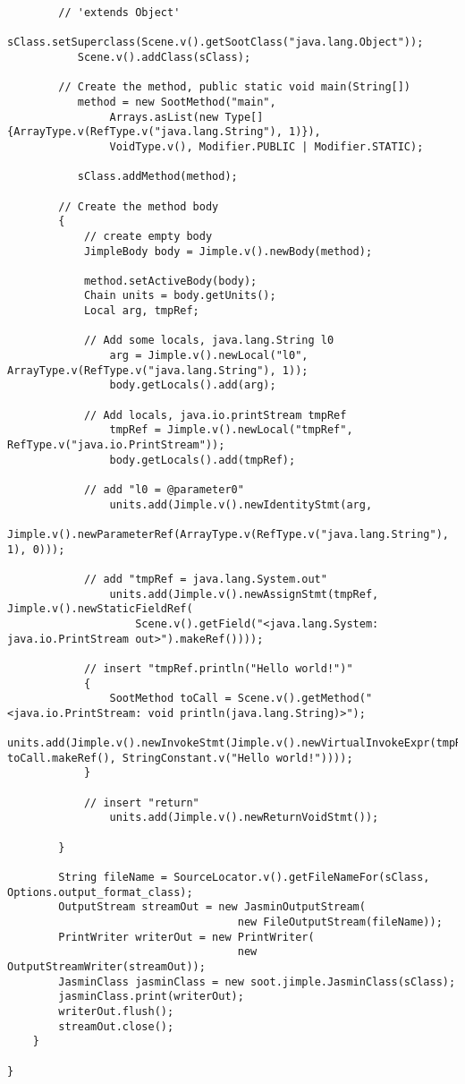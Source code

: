 \documentclass{article}
\begin{document}
\begin{verbatim}
        // 'extends Object'
           sClass.setSuperclass(Scene.v().getSootClass("java.lang.Object"));
           Scene.v().addClass(sClass);
           
        // Create the method, public static void main(String[])
           method = new SootMethod("main",
                Arrays.asList(new Type[] {ArrayType.v(RefType.v("java.lang.String"), 1)}),
                VoidType.v(), Modifier.PUBLIC | Modifier.STATIC);
        
           sClass.addMethod(method);
           
        // Create the method body
        {
            // create empty body
            JimpleBody body = Jimple.v().newBody(method);
            
            method.setActiveBody(body);
            Chain units = body.getUnits();
            Local arg, tmpRef;
            
            // Add some locals, java.lang.String l0
                arg = Jimple.v().newLocal("l0", ArrayType.v(RefType.v("java.lang.String"), 1));
                body.getLocals().add(arg);
            
            // Add locals, java.io.printStream tmpRef
                tmpRef = Jimple.v().newLocal("tmpRef", RefType.v("java.io.PrintStream"));
                body.getLocals().add(tmpRef);
                
            // add "l0 = @parameter0"
                units.add(Jimple.v().newIdentityStmt(arg, 
                     Jimple.v().newParameterRef(ArrayType.v(RefType.v("java.lang.String"), 1), 0)));
            
            // add "tmpRef = java.lang.System.out"
                units.add(Jimple.v().newAssignStmt(tmpRef, Jimple.v().newStaticFieldRef(
                    Scene.v().getField("<java.lang.System: java.io.PrintStream out>").makeRef())));
            
            // insert "tmpRef.println("Hello world!")"
            {
                SootMethod toCall = Scene.v().getMethod("<java.io.PrintStream: void println(java.lang.String)>");
                units.add(Jimple.v().newInvokeStmt(Jimple.v().newVirtualInvokeExpr(tmpRef, toCall.makeRef(), StringConstant.v("Hello world!"))));
            }                        
            
            // insert "return"
                units.add(Jimple.v().newReturnVoidStmt());
                     
        }

        String fileName = SourceLocator.v().getFileNameFor(sClass, Options.output_format_class);
        OutputStream streamOut = new JasminOutputStream(
                                    new FileOutputStream(fileName));
        PrintWriter writerOut = new PrintWriter(
                                    new OutputStreamWriter(streamOut));
        JasminClass jasminClass = new soot.jimple.JasminClass(sClass);
        jasminClass.print(writerOut);
        writerOut.flush();
        streamOut.close();
    }
        
}
\end{verbatim}
\end{document}
